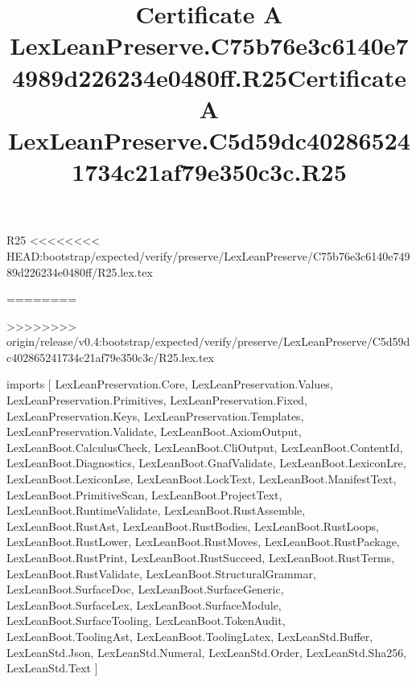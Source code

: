 \begin{lexlean}{R25}
<<<<<<<< HEAD:bootstrap/expected/verify/preserve/LexLeanPreserve/C75b76e3c6140e74989d226234e0480ff/R25.lex.tex
\title{Certificate A LexLeanPreserve.C75b76e3c6140e74989d226234e0480ff.R25}
========
\title{Certificate A LexLeanPreserve.C5d59dc402865241734c21af79e350c3c.R25}
>>>>>>>> origin/release/v0.4:bootstrap/expected/verify/preserve/LexLeanPreserve/C5d59dc402865241734c21af79e350c3c/R25.lex.tex
\begin{coremodule}
imports [
  LexLeanPreservation.Core,
  LexLeanPreservation.Values,
  LexLeanPreservation.Primitives,
  LexLeanPreservation.Fixed,
  LexLeanPreservation.Keys,
  LexLeanPreservation.Templates,
  LexLeanPreservation.Validate,
  LexLeanBoot.AxiomOutput,
  LexLeanBoot.CalculusCheck,
  LexLeanBoot.CliOutput,
  LexLeanBoot.ContentId,
  LexLeanBoot.Diagnostics,
  LexLeanBoot.GnafValidate,
  LexLeanBoot.LexiconLre,
  LexLeanBoot.LexiconLse,
  LexLeanBoot.LockText,
  LexLeanBoot.ManifestText,
  LexLeanBoot.PrimitiveScan,
  LexLeanBoot.ProjectText,
  LexLeanBoot.RuntimeValidate,
  LexLeanBoot.RustAssemble,
  LexLeanBoot.RustAst,
  LexLeanBoot.RustBodies,
  LexLeanBoot.RustLoops,
  LexLeanBoot.RustLower,
  LexLeanBoot.RustMoves,
  LexLeanBoot.RustPackage,
  LexLeanBoot.RustPrint,
  LexLeanBoot.RustSucceed,
  LexLeanBoot.RustTerms,
  LexLeanBoot.RustValidate,
  LexLeanBoot.StructuralGrammar,
  LexLeanBoot.SurfaceDoc,
  LexLeanBoot.SurfaceGeneric,
  LexLeanBoot.SurfaceLex,
  LexLeanBoot.SurfaceModule,
  LexLeanBoot.SurfaceTooling,
  LexLeanBoot.TokenAudit,
  LexLeanBoot.ToolingAst,
  LexLeanBoot.ToolingLatex,
  LexLeanStd.Buffer,
  LexLeanStd.Json,
  LexLeanStd.Numeral,
  LexLeanStd.Order,
  LexLeanStd.Sha256,
  LexLeanStd.Text
]


\end{coremodule}
\end{lexlean}

